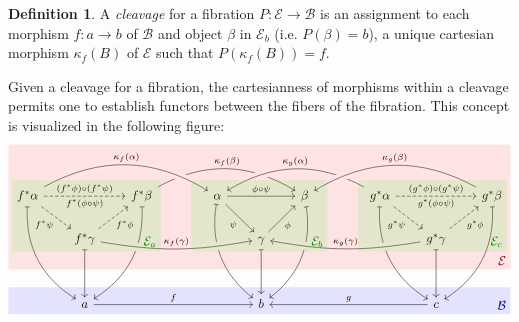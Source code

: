 \documentclass[10pt]{article}
\theoremstyle{definition}
\newtheorem{definition}{Definition}[section]
\theoremstyle{remark}
\newcommand{\catB}{\mathcal{B}}
\newcommand{\catE}{\mathcal{E}}
\begin{document}
\begin{definition}
    A \textit{cleavage} for a fibration $P : \catE \to \catB$ is an assignment to each morphism $f : a \to b$ of $\catB$ and object $\beta$ in $\catE_b$ (i.e. $P(\beta) = b$), a unique cartesian morphism $\kappa_{f}(B)$ of $\catE$ such that $P(\kappa_{f}(B)) = f$.
\end{definition}
Given a cleavage for a fibration, the cartesianness of morphisms within a cleavage permits one to establish functors between the fibers of the fibration. This concept is visualized in the following figure:
\begin{equation}
    \begin{tikzcd}[
            column sep=2em,
            execute at end picture={
                \fill[blue, opacity=0.1] (-7, -0.75) rectangle (+7, -1.5) node[above left, blue!50!black, opacity=1]{$\catB$};
                \fill[red, opacity=0.1] (-7, +3.25) rectangle (+7, -0.25) node[above left, red!50!black, opacity=1]{$\catE$};
                \fill[green, opacity=0.1] (-1.9, +2.25) rectangle (+1.9, +0.25) node[above left, green!50!black, opacity=1]{$\catE_b$};
                \fill[green, opacity=0.1] (-6.9, +2.25) rectangle (-2.75, +0.25) node[above left, green!50!black, opacity=1]{$\catE_a$};
                \fill[green, opacity=0.1] (+2.75, +2.25) rectangle (+6.9, +0.25) node[above left, green!50!black, opacity=1]{$\catE_c$};
            }
        ]
        f^\ast\alpha 
        \ar[rddd, mapsto, bend right] 
        \ar[rr, "f^\ast(\phi\circ\psi)"', "(f^\ast\phi) \circ (f^\ast\psi)", dashed] 
        \ar[rd, "f^\ast\psi"', dashed] 
        & & 
        f^\ast\beta 
        \ar[lddd, mapsto, bend left] 
        \ar[rrrr, "\kappa_f(\beta)", bend left]
        & &
        \alpha
        \ar[rddd, mapsto, bend right]
        \ar[rr, "\phi\circ \psi"]
        \ar[rd, "\psi"']
        \ar[from=llll, "\kappa_f(\alpha)", bend left, crossing over]
        \ar[from=rrrr, "\kappa_g(\alpha)"', bend right, crossing over]
        & & 
        \beta 
        \ar[lddd, mapsto, bend left] 
        \ar[from=rrrr, "\kappa_g(\beta)"', bend right, crossing over]
        & &
        g^\ast\alpha 
        \ar[rddd, mapsto, bend right] 
        \ar[rr, "g^\ast(\phi\circ\psi)"', "(g^\ast\phi) \circ (g^\ast\psi)", dashed] 
        \ar[rd, "g^\ast\psi"', dashed] 
        & & 
        g^\ast\beta 
        \ar[lddd, mapsto, bend left]
        \\
        & 
        f^\ast\gamma 
        \ar[dd, mapsto] 
        \ar[ru, "f^\ast\phi"', dashed] 
        \ar[rrrr, "\kappa_f(\gamma)", bend right=10, crossing over] 
        & & & & 
        \gamma 
        \ar[ru, "\phi"'] 
        \ar[dd, mapsto] 
        & & & & 
        g^\ast\gamma 
        \ar[dd, mapsto] 
        \ar[ru, "g^\ast\phi"', dashed] 
        \ar[llll, "\kappa_g(\gamma)"', bend left=10, crossing over] 
        & 
        \\
        & & & & & & & & & & 
        \\
        & 
        a 
        \ar[rrrr,"f"] 
        & & & & b & & & & 
        c 
        \ar[llll, "g"'] 
        & 
        \\
    \end{tikzcd}
\end{equation}
\end{document}
